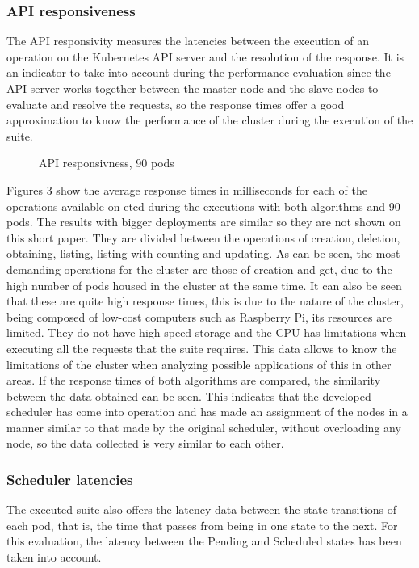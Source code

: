 \documentclass[conference]{IEEEtran}
\begin{document}
\subsubsection{API responsiveness}\label{sec:apiresp}
The API responsivity measures the latencies between the execution of an operation on the Kubernetes API server and the resolution of the response. It is an indicator to take into account during the 
performance evaluation since the API server works together between the master node and the slave nodes to evaluate and resolve the requests, so the response times offer a good approximation to know the 
performance of the cluster during the execution of the suite.

\begin{figure}[h]
\begin{center}
\strut{}
\caption{API responsivness, 90 pods}\label{fig:cluster}
\end{center}
\end{figure}

Figures 3 show the average response times in milliseconds for each of the operations available on etcd during the executions with both algorithms and 90 pods. The results with bigger deployments are similar so they are not shown on this short paper. They are divided between the operations of creation, deletion, obtaining, listing, listing with counting and updating. As can be seen, the most demanding operations for the cluster are those of creation and get, due to the high number of pods housed in the cluster at the same time. It can also be seen that these are quite high response times, this is due to the nature of the cluster, being composed of low-cost computers such as Raspberry Pi, its resources are limited. They do not have high speed storage and the CPU has limitations when executing all the requests that the suite requires. This data allows to know the limitations of the cluster when analyzing possible applications of this in other areas. If the response times of both algorithms are compared, the similarity between the data obtained can be seen. This indicates that the developed scheduler has come into operation and has made an assignment of the nodes in a manner similar to that made by the original scheduler, without overloading any node, so the data collected is very similar to each other.


\subsubsection{Scheduler latencies}\label{sec:schedlat}
The executed suite also offers the latency data between the state transitions of each pod, that is, the time that passes from being in one state to the next. For this evaluation, the latency between the Pending and Scheduled states has been taken into account.
\end{document}
